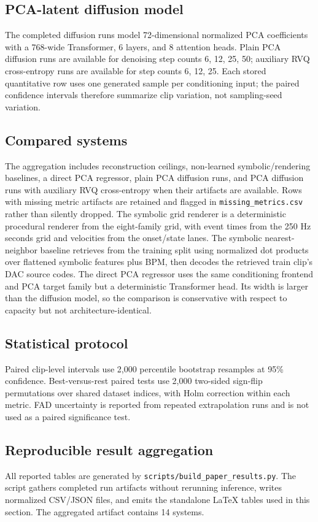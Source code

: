 \documentclass[11pt]{article}
\begin{document}
\subsection{PCA-latent diffusion model}
The completed diffusion runs model 72-dimensional normalized PCA coefficients with a 768-wide Transformer, 6 layers, and 8 attention heads. Plain PCA diffusion runs are available for denoising step counts 6, 12, 25, 50; auxiliary RVQ cross-entropy runs are available for step counts 6, 12, 25. Each stored quantitative row uses one generated sample per conditioning input; the paired confidence intervals therefore summarize clip variation, not sampling-seed variation.

\subsection{Compared systems}
The aggregation includes reconstruction ceilings, non-learned symbolic/rendering baselines, a direct PCA regressor, plain PCA diffusion runs, and PCA diffusion runs with auxiliary RVQ cross-entropy when their artifacts are available. Rows with missing metric artifacts are retained and flagged in \texttt{missing\_metrics.csv} rather than silently dropped.
The symbolic grid renderer is a deterministic procedural renderer from the eight-family grid, with event times from the 250 Hz seconds grid and velocities from the onset/state lanes. The symbolic nearest-neighbor baseline retrieves from the training split using normalized dot products over flattened symbolic features plus BPM, then decodes the retrieved train clip's DAC source codes.
The direct PCA regressor uses the same conditioning frontend and PCA target family but a deterministic Transformer head. Its width is larger than the diffusion model, so the comparison is conservative with respect to capacity but not architecture-identical.

\subsection{Statistical protocol}
Paired clip-level intervals use 2,000 percentile bootstrap resamples at 95\% confidence. Best-versus-rest paired tests use 2,000 two-sided sign-flip permutations over shared dataset indices, with Holm correction within each metric. FAD uncertainty is reported from repeated extrapolation runs and is not used as a paired significance test.

\subsection{Reproducible result aggregation}
All reported tables are generated by \texttt{scripts/build\_paper\_results.py}. The script gathers completed run artifacts without rerunning inference, writes normalized CSV/JSON files, and emits the standalone \LaTeX{} tables used in this section. The aggregated artifact contains 14 systems.
\end{document}
